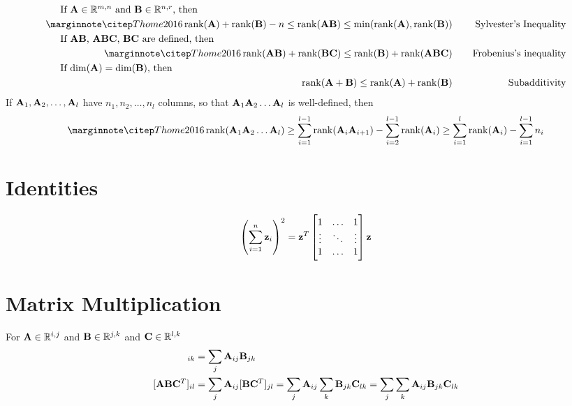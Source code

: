\begin{align}
\noalign{If $\mA\in\sRmn$ and $\mB\in\sRnr$, then}
\eqcite{Thome2016}
\rank(\mA)+\rank(\mB)-n\le \rank(\mA\mB)\le \min(\rank(\mA),\rank(\mB)) &&~~~~\textrm{Sylvester's Inequality} \\
\noalign{If $\mA\mB$, $\mA\mB\mC$, $\mB\mC$ are defined, then}
\eqcite{Thome2016}
\rank(\mA\mB)+\rank(\mB\mC)\le \rank(\mB)+\rank(\mA\mB\mC) && \textrm{Frobenius's inequality} \\
\noalign{If $\dim(\mA)=\dim(\mB)$, then}
\rank(\mA+\mB)\le\rank(\mA)+\rank(\mB) &&\textrm{Subadditivity}
\end{align}
If $\mathbf{A}_1, \mathbf{A}_2, \ldots, \mathbf{A}_l$ have $n_1,n_2,\ldots,n_l$ columns, so that $\mathbf{A}_1\mathbf{A}_2\ldots\mathbf{A}_l$ is well-defined, then
\begin{equation}
\eqcite{Thome2016}
\rank(\mA_1\mA_2\ldots\mA_l)
\ge \sum_{i=1}^{l-1}\rank(\mA_i\mA_{i+1})-\sum_{i=2}^{l-1}\rank(\mA_i)
\ge\sum_{i=1}^l\rank(\mA_i)-\sum_{i=1}^{l-1}n_i 
\end{equation}

\section{Identities}
\begin{align}
\left(\sum_{i=1}^n \mathbf{z}_i\right)^2 = \mathbf{z}^T
\begin{bmatrix}
1      & \hdots & 1      \\
\vdots & \ddots & \vdots \\
1      & \hdots & 1      
\end{bmatrix}
\mathbf{z}
\end{align}

\section{Matrix Multiplication}

For $\mathbf{A}\in\mathbb{R}^{i,j}$ and $\mathbf{B}\in\mathbb{R}^{j,k}$ and $\mathbf{C}\in\mathbb{R}^{l,k}$
\begin{align}
[\mA\mB]_{ik} &= \sum_j \mA_{ij}\mB_{jk} \\
[\mA\mB\mC^T]_{il} &= \sum_j \mA_{ij}[\mB\mC^T]_{jl}=\sum_j \mA_{ij}\sum_k \mB_{jk}\mC_{lk}=\sum_j\sum_k \mA_{ij}\mB_{jk}\mC_{lk}
\end{align}



